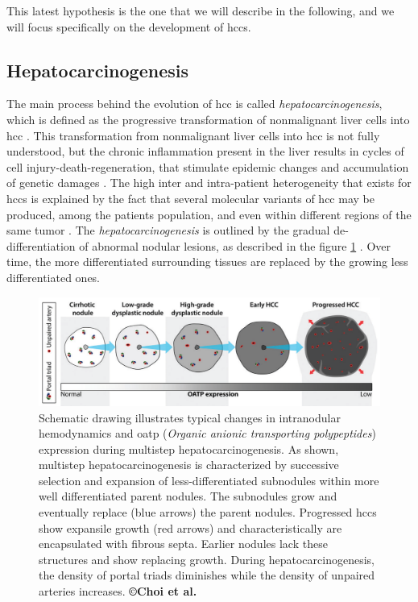 This latest hypothesis is the one that we will describe in the
following, and we will focus specifically on the development of
\ac{hcc}s.

\subsection{Hepatocarcinogenesis}\label{hepatocarcinogenesis}

The main process behind the evolution of \ac{hcc} is called
\emph{hepatocarcinogenesis}, which is
defined as the progressive transformation of nonmalignant liver cells
into \ac{hcc} \cite{Choi2014}. 
This transformation from nonmalignant liver cells into \ac{hcc} is not
fully understood, but the chronic inflammation present in the liver
results in cycles of cell injury-death-regeneration, that stimulate
epidemic changes and accumulation of genetic damages \cite{Thorgeirsson2002,Aravalli2013,Brody2012,Trevisani2008a}. 
The high inter and intra-patient heterogeneity that exists for
\ac{hcc}s is explained by the fact that several molecular variants of
\ac{hcc} may be produced, among the patients population, and even
within different regions of the same tumor \cite{Trevisani2008a,Frenette2011}.
The \emph{hepatocarcinogenesis} is outlined by the gradual
de-differentiation of abnormal nodular lesions, as described in the
figure \ref{Choi2014_Fig1} \cite{Park2011,Frenette2011}. Over time, the more
differentiated surrounding tissues are replaced by the growing less
differentiated ones.

\begin{figure}[ht!]
\centering
\includegraphics[width=0.7\linewidth]{images/image4}
\caption{Schematic drawing illustrates typical changes in intranodular hemodynamics and \ac{oatp} (\emph{Organic anionic
  transporting polypeptides}) expression during multistep hepatocarcinogenesis. As shown, multistep hepatocarcinogenesis is characterized by successive selection and expansion of less-differentiated subnodules within more well differentiated parent nodules. The subnodules grow and eventually replace (blue arrows) the parent nodules. Progressed \ac{hcc}s show expansile growth (red arrows) and characteristically are encapsulated with fibrous septa. Earlier nodules lack these structures and show replacing growth. During hepatocarcinogenesis, the density of portal triads diminishes while the density of unpaired arteries increases. \textbf{©Choi et al. \cite{Choi2014}}}
\label{Choi2014_Fig1}
\end{figure}


